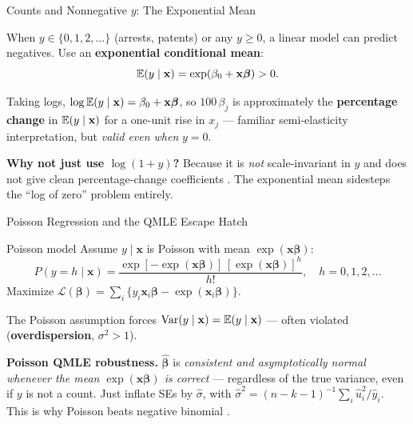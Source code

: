 \documentclass[aspectratio=169, 12pt]{beamer}
\newcommand{\xbeta}{\mathbf{x}\boldsymbol{\beta}}   %
\newcommand{\xib}{\mathbf{x}_i\boldsymbol{\beta}}    %
\begin{document}
\begin{frame}[shrink=12]{Counts and Nonnegative $y$: The Exponential Mean}

  When $y \in \{0,1,2,\ldots\}$ (arrests, patents) or any $y\ge 0$, a linear model
  can predict negatives. Use an \textbf{exponential conditional mean}:
  \[
    \E(y\mid\mathbf{x}) = \exp(\beta_0 + \xbeta) > 0 .
  \]

  \begin{highlightbox}
    Taking logs, $\log \E(y\mid\mathbf{x}) = \beta_0 + \xbeta$, so
    $100\,\beta_j$ is approximately the \textbf{percentage change} in
    $\operatorname{\mathbb{E}}(y\mid\mathbf{x})$ for a one-unit rise in $x_j$ --- familiar
    semi-elasticity interpretation, but \emph{valid even when} $y=0$.
  \end{highlightbox}

  \smallskip

  \begin{keybox}
    \textbf{Why not just use $\log(1+y)$?} Because it is \emph{not} scale-invariant
    in $y$ and does not give clean percentage-change coefficients
    \citep{ChenRoth2024_logs}. The exponential mean sidesteps the ``log of zero''
    problem entirely.
  \end{keybox}

\end{frame}

\begin{frame}[shrink=10]{Poisson Regression and the QMLE Escape Hatch}

  \begin{definitionbox}{Poisson model}
    Assume $y\mid\mathbf{x}$ is Poisson with mean $\exp(\xbeta)$:
    \[
      P(y=h\mid\mathbf{x}) = \frac{\exp[-\exp(\xbeta)]\,[\exp(\xbeta)]^{h}}{h!},
      \quad h = 0,1,2,\ldots
    \]
    Maximize $\mathcal{L}(\boldsymbol\beta)=\sum_i\{y_i\xib - \exp(\xib)\}$.
  \end{definitionbox}

  \smallskip

  The Poisson assumption forces $\operatorname{Var}(y\mid\mathbf{x}) = \operatorname{\mathbb{E}}(y\mid\mathbf{x})$ ---
  often violated (\textbf{overdispersion}, $\sigma^2>1$).

  \begin{keybox}
    \small
    \textbf{Poisson QMLE robustness.} $\hat{\boldsymbol\beta}$ is \emph{consistent
    and asymptotically normal whenever the mean $\exp(\xbeta)$ is correct} ---
    regardless of the true variance, even if $y$ is not a count. Just inflate SEs
    by $\hat\sigma$, with $\hat\sigma^2 = (n-k-1)^{-1}\sum_i \hat u_i^2/\hat y_i$.
    This is why Poisson beats negative binomial \citep{SantosSilvaTenreyro2006_log}.
  \end{keybox}

\end{frame}
\end{document}
